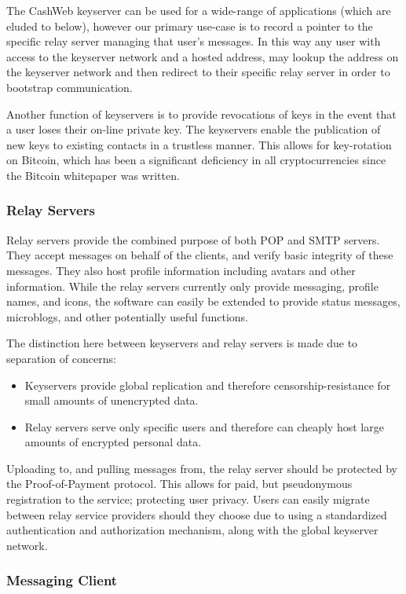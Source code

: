 \documentclass{article}
\begin{document}
The CashWeb keyserver can be used for a wide-range of applications (which are eluded to below), however our primary use-case is to record a pointer to the specific relay server managing that user's messages. In this way any user with access to the keyserver network and a hosted address, may lookup the address on the keyserver network and then redirect to their specific relay server in order to bootstrap communication. 

Another function of keyservers is to provide revocations of keys in the event that a user loses their on-line private key. The keyservers enable the publication of new keys to existing contacts in a trustless manner. This allows for key-rotation on Bitcoin, which has been a significant deficiency in all cryptocurrencies since the Bitcoin whitepaper was written.

\subsubsection{Relay Servers}

Relay servers provide the combined purpose of both POP and SMTP servers. They accept messages on behalf of the clients, and verify basic integrity of these messages. They also host profile information including avatars and other information. While the relay servers currently only provide messaging, profile names, and icons, the software can easily be extended to provide status messages, microblogs, and other potentially useful functions.

The distinction here between keyservers and relay servers is made due to separation of concerns:
\begin{itemize}
  \item Keyservers provide global replication and therefore censorship-resistance for small amounts of unencrypted data.
  \item Relay servers serve only specific users and therefore can cheaply host large amounts of encrypted personal data.
\end{itemize}

Uploading to, and pulling messages from, the relay server should be protected by the Proof-of-Payment protocol. This allows for paid, but pseudonymous registration to the service; protecting user privacy. Users can easily migrate between relay service providers should they choose due to using a standardized authentication and authorization mechanism, along with the global keyserver network.

\subsubsection{Messaging Client}
\end{document}
